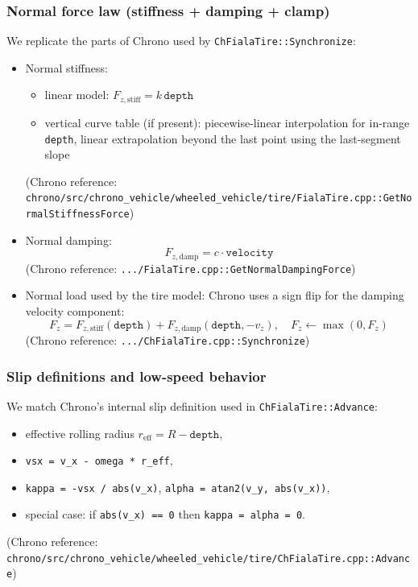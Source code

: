 \subsubsection{Normal force law (stiffness + damping + clamp)}
We replicate the parts of Chrono used by \texttt{ChFialaTire::Synchronize}:
\begin{itemize}
  \item Normal stiffness:
    \begin{itemize}
      \item linear model: $F_{z,\text{stiff}} = k\,\texttt{depth}$
      \item vertical curve table (if present): piecewise-linear interpolation for in-range \texttt{depth},
            linear extrapolation beyond the last point using the last-segment slope
    \end{itemize}
    (Chrono reference: \texttt{chrono/src/chrono\_vehicle/wheeled\_vehicle/tire/FialaTire.cpp::GetNormalStiffnessForce})
  \item Normal damping:
    \[
      F_{z,\text{damp}} = c \cdot \texttt{velocity}
    \]
    (Chrono reference: \texttt{.../FialaTire.cpp::GetNormalDampingForce})
  \item Normal load used by the tire model:
    Chrono uses a sign flip for the damping velocity component:
    \[
      F_z = F_{z,\text{stiff}}(\texttt{depth}) + F_{z,\text{damp}}(\texttt{depth}, -v_z),\quad F_z \leftarrow \max(0, F_z)
    \]
    (Chrono reference: \texttt{.../ChFialaTire.cpp::Synchronize})
\end{itemize}

\subsubsection{Slip definitions and low-speed behavior}
We match Chrono's internal slip definition used in \texttt{ChFialaTire::Advance}:
\begin{itemize}
  \item effective rolling radius $r_{\mathrm{eff}} = R - \texttt{depth}$,
  \item \texttt{vsx = v\_x - omega * r\_eff},
  \item \texttt{kappa = -vsx / abs(v\_x)}, \texttt{alpha = atan2(v\_y, abs(v\_x))},
  \item special case: if \texttt{abs(v\_x) == 0} then \texttt{kappa = alpha = 0}.
\end{itemize}
(Chrono reference: \texttt{chrono/src/chrono\_vehicle/wheeled\_vehicle/tire/ChFialaTire.cpp::Advance})

